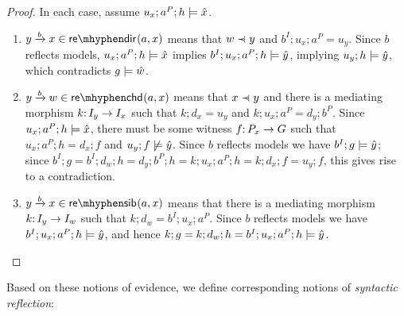 %
\begin{proof}
In each case, assume $u_x;a^P;h\models \hat x$.
\begin{enumerate}
\item $\trip ybx\in \sdir{a,x}$ means that $w\parentof y$ and $b^I;u_x;a^P=u_y$. Since $b$ reflects models, $u_x;a^P;h\models \hat x$ implies $b^I;u_x;a^P;h\models \hat y$, implying $u_y;h\models \hat y$, which contradicts $g\models \hat w$.

\item $\trip ybw\in \schd{a,x}$ means that $x\parentof y$ and there is a mediating morphism $k{:}\, I_y\rightarrow I_x$ such that $k;d_x=u_y$ and $k;u_x;a^P=d_y;b^P$. Since $u_x;a^P;h\models \hat x$, there must be some witness $f{:}\, P_x\rightarrow G$ such that $u_x;a^P;h=d_x;f$ and $u_y;f\not\models \hat y$. Since $b$ reflects models we have $b^I;g\models \hat y$; since $b^I;g= b^I;d_w;h= d_y;b^P;h= k;u_x;a^P;h=k;d_x;f=u_y;f$, this gives rise to a contradiction.

\item $\trip ybx\in \ssib{a,x}$ means that there is a mediating morphism $k{:}\, I_y\rightarrow I_w$ such that $k;d_w=b^I;u_x;a^P$. Since $b$ reflects models we have $b^I;u_x;a^P;h\models \hat y$, and hence $k;g=k;d_w;h=b^I;u_x;a^P;h\models \hat y$.
\end{enumerate}
\end{proof}
%
Based on these notions of evidence, we define corresponding notions of \emph{syntactic reflection}:

